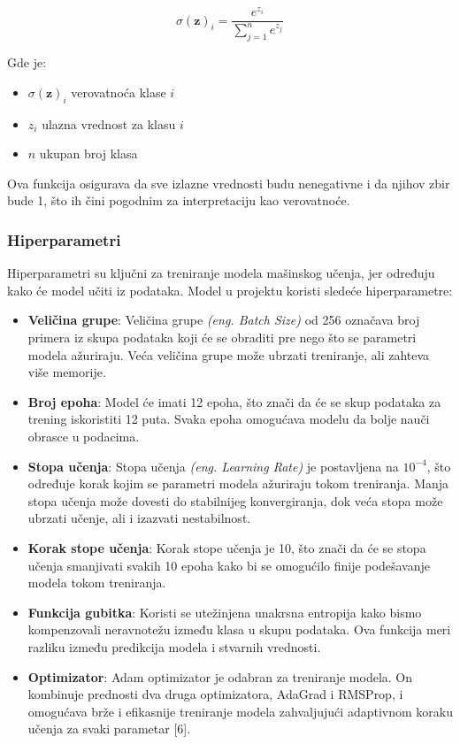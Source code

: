 \documentclass{article}
\begin{document}
\[ \sigma(\mathbf{z})_i = \frac{e^{z_i}}{\sum_{j=1}^n e^{z_j}} \]

Gde je:
\begin{itemize}
    \item \( \sigma(\mathbf{z})_i \) verovatnoća klase \(i\)
    \item \( z_i \) ulazna vrednost za klasu \(i\)
    \item \( n \) ukupan broj klasa
\end{itemize}

Ova funkcija osigurava da sve izlazne vrednosti budu nenegativne i da njihov zbir bude 1, što ih čini pogodnim za interpretaciju kao verovatnoće.

\subsubsection{Hiperparametri}

Hiperparametri su ključni za treniranje modela mašinskog učenja, jer određuju kako će model učiti iz podataka. Model u projektu koristi sledeće hiperparametre:

\begin{itemize}
    \item \textbf{Veličina grupe}: Veličina grupe \textit{(eng. Batch Size)} od 256 označava broj primera iz skupa podataka koji će se obraditi pre nego što se parametri modela ažuriraju. Veća veličina grupe može ubrzati treniranje, ali zahteva više memorije.
    \item \textbf{Broj epoha}: Model će imati 12 epoha, što znači da će se skup podataka za trening iskoristiti 12 puta. Svaka epoha omogućava modelu da bolje nauči obrasce u podacima.
    \item \textbf{Stopa učenja}: Stopa učenja \textit{(eng. Learning Rate)} je postavljena na $10^{-4}$, što određuje korak kojim se parametri modela ažuriraju tokom treniranja. Manja stopa učenja može dovesti do stabilnijeg konvergiranja, dok veća stopa može ubrzati učenje, ali i izazvati nestabilnost.
    \item \textbf{Korak stope učenja}: Korak stope učenja je 10, što znači da će se stopa učenja smanjivati svakih 10 epoha kako bi se omogućilo finije podešavanje modela tokom treniranja.
    \item \textbf{Funkcija gubitka}: Koristi se utežinjena unakrsna entropija kako bismo kompenzovali neravnotežu između klasa u skupu podataka. Ova funkcija meri razliku između predikcija modela i stvarnih vrednosti.
    \item \textbf{Optimizator}: Adam optimizator je odabran za treniranje modela. On kombinuje prednosti dva druga optimizatora, AdaGrad i RMSProp, i omogućava brže i efikasnije treniranje modela zahvaljujući adaptivnom koraku učenja za svaki parametar [6].
\end{itemize}
\end{document}
